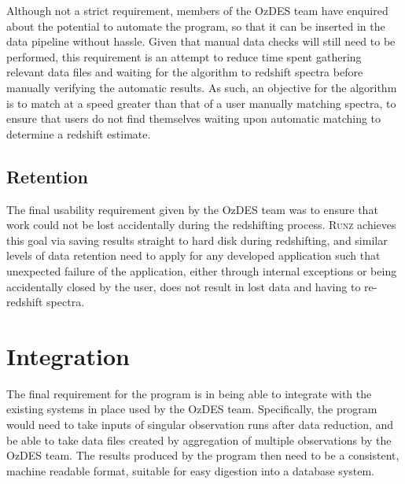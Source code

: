 \documentclass[titlesmallcaps, examinerscopy, copyrightpage]{uqthesis}
\newcommand{\runz}{\textsc{Runz}}
\begin{document}
Although not a strict requirement, members of the OzDES team have enquired about the potential to automate the program, so that it can be inserted in the data pipeline without hassle. Given that manual data checks will still need to be performed, this requirement is an attempt to reduce time spent gathering relevant data files and waiting for the algorithm to redshift spectra before manually verifying the automatic results. As such, an objective for the algorithm is to match at a speed greater than that of a user manually matching spectra, to ensure that users do not find themselves waiting upon automatic matching to determine a redshift estimate.

\subsection{Retention}

The final usability requirement given by the OzDES team was to ensure that work could not be lost accidentally during the redshifting process. \runz{} achieves this goal via saving results straight to hard disk during redshifting, and similar levels of data retention need to apply for any developed application such that unexpected failure of the application, either through internal exceptions or being accidentally closed by the user, does not result in lost data and having to re-redshift spectra.




\section{Integration}

The final requirement for the program is in being able to integrate with the existing systems in place used by the OzDES team. Specifically, the program would need to take inputs of singular observation runs after data reduction, and be able to take data files created by aggregation of multiple observations by the OzDES team. The results produced by the program then need to be a consistent, machine readable format, suitable for easy digestion into a database system.
\end{document}
